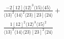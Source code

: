 \documentclass[varwidth, border=5pt]{standalone}
\begin{document}
\begin{my}
$\begin{gathered}
\scriptscriptstyle\frac{-2[12]⟨12⟩^3⟨15⟩⟨45⟩}{⟨13⟩^2⟨14⟩^2⟨23⟩[23]⟨24⟩}+\\
\scriptscriptstyle\frac{1[12]^2⟨12⟩^3⟨15⟩^2}{⟨13⟩^3⟨14⟩⟨23⟩[23]^2⟨24⟩}\phantom{+}
\end{gathered}$
\end{my}
\end{document}
